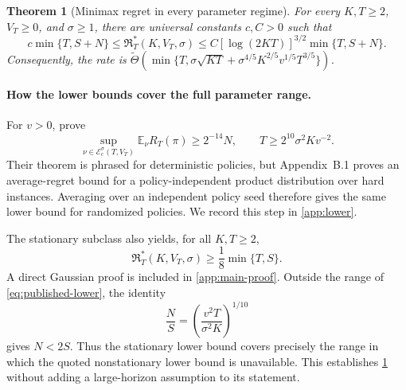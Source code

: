 \documentclass[11pt]{article}
\newtheorem{theorem}{Theorem}[section]
\theoremstyle{remark}
\newcommand{\E}{\mathbb E}
\newcommand{\cE}{\mathcal E}
\newcommand{\calR}{\mathfrak R}
\begin{document}
\begin{samepage}
\begin{theorem}[Minimax regret in every parameter regime]\label{cor:minimax-main}
For every $K,T\ge2$, $V_T\ge0$, and $\sigma\ge1$, there are universal constants $c,C>0$ such that
\begin{equation}\label{eq:minimax-main}
c\min\{T,S+N\}
\le\calR_T^*(K,V_T,\sigma)
\le C[\log(2KT)]^{3/2}\min\{T,S+N\}.
\end{equation}
Consequently, the rate is
$\widetilde\Theta(\min\{T,\sigma\sqrt{KT}+\sigma^{4/5}K^{2/5}v^{1/5}T^{3/5}\})$.
\end{theorem}
\end{samepage}

\paragraph{How the lower bounds cover the full parameter range.}
For $v>0$, \citet[Theorem~3.3]{migali2025tightening} prove
\begin{equation}\label{eq:published-lower}
\sup_{\nu\in\cE_c^\sigma(T,V_T)}\E_\nu R_T(\pi)
\ge 2^{-14}N,
\qquad
T\ge 2^{10}\sigma^2K v^{-2}.
\end{equation}
Their theorem is phrased for deterministic policies, but Appendix~B.1 proves an average-regret bound for a policy-independent product distribution over hard instances. Averaging over an independent policy seed therefore gives the same lower bound for randomized policies. We record this step in \cref{app:lower}.

The stationary subclass also yields, for all $K,T\ge2$,
\begin{equation}\label{eq:stationary-lower}
\calR_T^*(K,V_T,\sigma)\ge\frac18\min\{T,S\}.
\end{equation}
A direct Gaussian proof is included in \cref{app:main-proof}. Outside the range of \eqref{eq:published-lower}, the identity
\begin{equation}\label{eq:ratio-main}
\frac NS=\left(\frac{v^2T}{\sigma^2K}\right)^{1/10}
\end{equation}
gives $N<2S$. Thus the stationary lower bound covers precisely the range in which the quoted nonstationary lower bound is unavailable. This establishes \cref{cor:minimax-main} without adding a large-horizon assumption to its statement.
\end{document}
